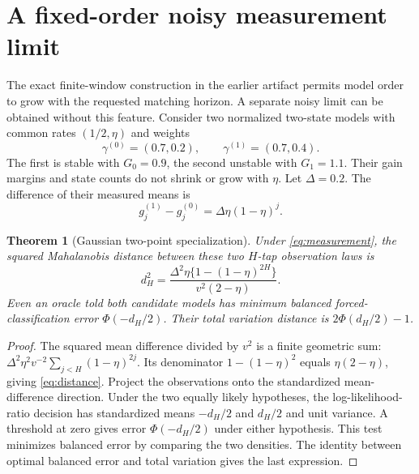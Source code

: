 \documentclass[11pt]{article}
\newtheorem{theorem}[proposition]{Theorem}
\theoremstyle{remark}\newtheorem{remark}[proposition]{Remark}
\begin{document}
\section{A fixed-order noisy measurement limit}\label{sec:limit}
The exact finite-window construction in the earlier artifact permits model order to grow with the requested matching horizon. A separate noisy limit can be obtained without this feature. Consider two normalized two-state models with common rates $(1/2,\eta)$ and weights
\begin{equation}
 \gamma^{(0)}=(0.7,0.2),\qquad\gamma^{(1)}=(0.7,0.4).
\end{equation}
The first is stable with $G_0=0.9$, the second unstable with $G_1=1.1$. Their gain margins and state counts do not shrink or grow with $\eta$. Let $\Delta=0.2$. The difference of their measured means is
\begin{equation}
 g_j^{(1)}-g_j^{(0)}=\Delta\eta(1-\eta)^j.
\end{equation}

\begin{theorem}[Gaussian two-point specialization]\label{thm:gaussian}
Under \eqref{eq:measurement}, the squared Mahalanobis distance between these two $H$-tap observation laws is
\begin{equation}
 d_H^2=\frac{\Delta^2\eta\{1-(1-\eta)^{2H}\}}{v^2(2-\eta)}.\label{eq:distance}
\end{equation}
Even an oracle told both candidate models has minimum balanced forced-classification error $\Phi(-d_H/2)$. Their total variation distance is $2\Phi(d_H/2)-1$.
\end{theorem}
\begin{proof}
The squared mean difference divided by $v^2$ is a finite geometric sum:
$\Delta^2\eta^2v^{-2}\sum_{j<H}(1-\eta)^{2j}$.
Its denominator $1-(1-\eta)^2$ equals $\eta(2-\eta)$, giving \eqref{eq:distance}. Project the observations onto the standardized mean-difference direction. Under the two equally likely hypotheses, the log-likelihood-ratio decision has standardized means $-d_H/2$ and $d_H/2$ and unit variance. A threshold at zero gives error $\Phi(-d_H/2)$ under either hypothesis. This test minimizes balanced error by comparing the two densities. The identity between optimal balanced error and total variation gives the last expression.
\end{proof}
\end{document}
